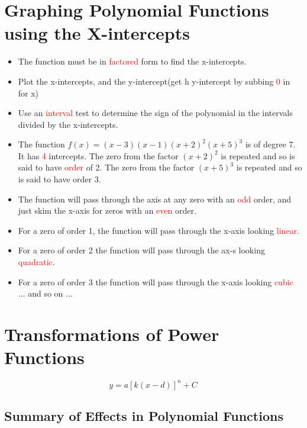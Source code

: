 \documentclass{article}
\begin{document}
\section{Graphing Polynomial Functions using the X-intercepts}
\begin{itemize}
    \item The function must be in \textcolor{red}{factored} form to find the x-intercepts.
    \item Plot the x-intercepts, and the y-intercept(get h y-intercept by subbing \textcolor{red}{0} in for x)
    \item Use an \textcolor{red}{interval} test to determine the sign of the polynomial in the intervals divided by the x-intercepts.
    \item The function $f(x)=(x-3)(x-1)(x+2)^2(x+5)^3$ is of degree 7. It has \textcolor{red}{4} intercepts. The zero from the factor $(x+2)^2$ is repeated and so is said to have \textcolor{red}{order} of 2. The zero from the factor $(x+5)^3$ is repeated and so is said to have order $3$.
    \item The function will pass through the axis at any zero with an \textcolor{red}{odd} order, and just skim the x-axis for zeros with an \textcolor{red}{even} order.
    \item For a zero of order 1, the function will pass through the x-axis looking \textcolor{red}{linear}.
    \item For a zero of order 2 the function will pass through the ax-s looking \textcolor{red}{quadratic}.
    \item For a zero of order 3 the function will pass through the x-axis looking \textcolor{red}{cubic} $\dots$ and so on $\dots$
\end{itemize}
\section{Transformations of Power Functions}


$$y=a[k(x-d)]^n+C$$
\subsection*{Summary of Effects in Polynomial Functions}
\end{document}
